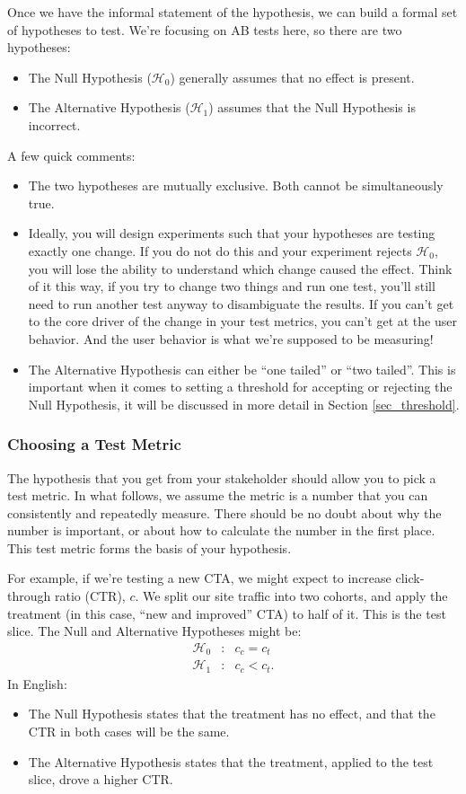 \documentclass{article}
\numberwithin{equation}{section}
\begin{document}
Once we have the informal statement of the hypothesis, we can build a formal set of hypotheses to test. We're focusing on AB tests here, so there are two hypotheses:
\begin{itemize}
	\item The Null Hypothesis ($\mathcal{H}_0$) generally assumes that no effect is present.
	\item The Alternative Hypothesis ($\mathcal{H}_1$) assumes that the Null Hypothesis is incorrect.
\end{itemize}
A few quick comments:
\begin{itemize}
	\item The two hypotheses are mutually exclusive. Both cannot be simultaneously true.
	\item Ideally, you will design experiments such that your hypotheses are testing exactly one change. If you do not do this and your experiment rejects $\mathcal{H}_0$, you will lose the ability to understand which change caused the effect. Think of it this way, if you try to change two things and run one test, you'll still need to run another test anyway to disambiguate the results. If you can't get to the core driver of the change in your test metrics, you can't get at the user behavior. And the user behavior is what we're supposed to be measuring!
	\item The Alternative Hypothesis can either be ``one tailed'' or ``two tailed''. This is important when it comes to setting a threshold for accepting or rejecting the Null Hypothesis, it will be discussed in more detail in Section \ref{sec_threshold}.
\end{itemize}

\subsubsection{Choosing a Test Metric}
The hypothesis that you get from your stakeholder should allow you to pick a test metric. In what follows, we assume the metric is a number that you can consistently and repeatedly measure. There should be no doubt about why the number is important, or about how to calculate the number in the first place. This test metric forms the basis of your hypothesis.

For example, if we're testing a new CTA, we might expect to increase click-through ratio (CTR), $c$. We split our site traffic into two cohorts, and apply the treatment (in this case, ``new and improved'' CTA) to half of it. This is the test slice. The Null and Alternative Hypotheses might be:
\begin{eqnarray}
	\mathcal{H}_0 &:& c_c = c_t \\
	\mathcal{H}_1 &:& c_c < c_t.
\end{eqnarray}
In English: 
\begin{itemize}
	\item The Null Hypothesis states that the treatment has no effect, and that the CTR in both cases will be the same.
	\item The Alternative Hypothesis states that the treatment, applied to the test slice, drove a higher CTR.
\end{itemize}
\end{document}
